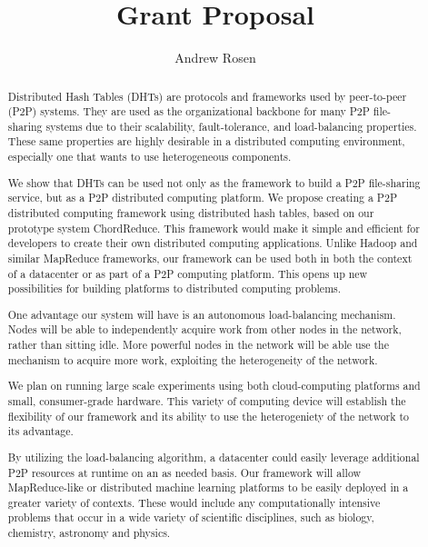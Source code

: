 \documentclass[12pt,a4paper]{article}
\author{Andrew Rosen}
\title{Grant Proposal}
\date{}
\begin{document}
\maketitle


\newpage

\begin{abstract}

Distributed Hash Tables (DHTs) are protocols and frameworks used by peer-to-peer (P2P) systems.
They are used as the organizational backbone for many P2P file-sharing systems due to their scalability, fault-tolerance, and load-balancing properties.
These same properties are highly desirable in a distributed computing environment, especially one that wants to use heterogeneous components.

We show that DHTs can be used not only as the framework to build a P2P file-sharing service, but as a P2P distributed computing platform.
We propose creating a P2P distributed computing framework using distributed hash tables, based on our prototype system ChordReduce.
This framework would make it simple and efficient for developers to create their own distributed computing applications.
Unlike Hadoop and similar MapReduce frameworks, our framework can be used both in both the context of a datacenter or as part of a P2P computing platform.  
This opens up new possibilities for building platforms to distributed computing problems.

One advantage our system will have is an autonomous load-balancing mechanism.
Nodes will be able to independently acquire work from other nodes in the network, rather than sitting idle.
More powerful nodes in the network will be able use the mechanism to acquire more work, exploiting the heterogeneity of the network.

We plan on running large scale experiments using both cloud-computing platforms and small, consumer-grade hardware.
This variety of computing device will establish the flexibility of our framework and its ability to use the heterogeniety of the network to its advantage.

By utilizing the load-balancing algorithm, a datacenter could easily leverage additional P2P resources at runtime on an as needed basis.
Our framework will allow MapReduce-like or distributed machine learning platforms to be easily deployed in a greater variety of contexts.
These would include any computationally intensive problems that occur in a wide variety of scientific disciplines, such as biology, chemistry, astronomy and physics.

\end{abstract}
\end{document}
